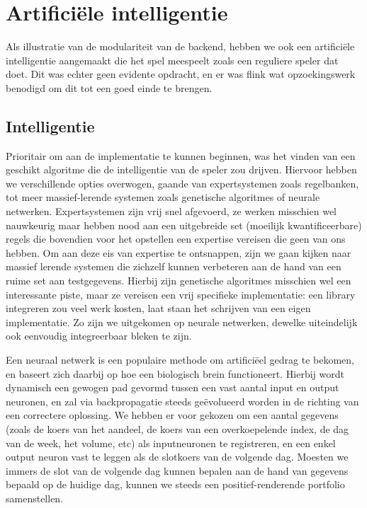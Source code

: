\chapter{Artifici\"ele intelligentie}

Als illustratie van de modulariteit van de backend, hebben we ook een artifici\"ele intelligentie aangemaakt die het spel meespeelt zoals een reguliere speler dat doet. Dit was echter geen evidente opdracht, en er was flink wat opzoekingswerk benodigd om dit tot een goed einde te brengen.


\section{Intelligentie}

Prioritair om aan de implementatie te kunnen beginnen, was het vinden van een geschikt algoritme die de intelligentie van de speler zou drijven. Hiervoor hebben we verschillende opties overwogen, gaande van expertsystemen zoals regelbanken, tot meer massief-lerende systemen zoals genetische algoritmes of neurale netwerken. Expertsystemen zijn vrij snel afgevoerd, ze werken misschien wel nauwkeurig maar hebben nood aan een uitgebreide set (moeilijk kwantificeerbare) regels die bovendien voor het opstellen een expertise vereisen die geen van ons hebben. Om aan deze eis van expertise te ontsnappen, zijn we gaan kijken naar massief lerende systemen die zichzelf kunnen verbeteren aan de hand van een ruime set aan testgegevens. Hierbij zijn genetische algoritmes misschien wel een interessante piste, maar ze vereisen een vrij specifieke implementatie: een library integreren zou veel werk kosten, laat staan het schrijven van een eigen implementatie. Zo zijn we uitgekomen op neurale netwerken, dewelke uiteindelijk ook eenvoudig integreerbaar bleken te zijn.

Een neuraal netwerk is een populaire methode om artifici\"eel gedrag te bekomen, en baseert zich daarbij op hoe een biologisch brein functioneert. Hierbij wordt dynamisch een gewogen pad gevormd tussen een vast aantal input en output neuronen, en zal via backpropagatie steeds ge\"evolueerd worden in de richting van een correctere oplossing. We hebben er voor gekozen om een aantal gegevens (zoals de koers van het aandeel, de koers van een overkoepelende index, de dag van de week, het volume, etc) als inputneuronen te registreren, en een enkel output neuron vast te leggen als de slotkoers van de volgende dag. Moesten we immers de slot van de volgende dag kunnen bepalen aan de hand van gegevens bepaald op de huidige dag, kunnen we steeds een positief-renderende portfolio samenstellen.

